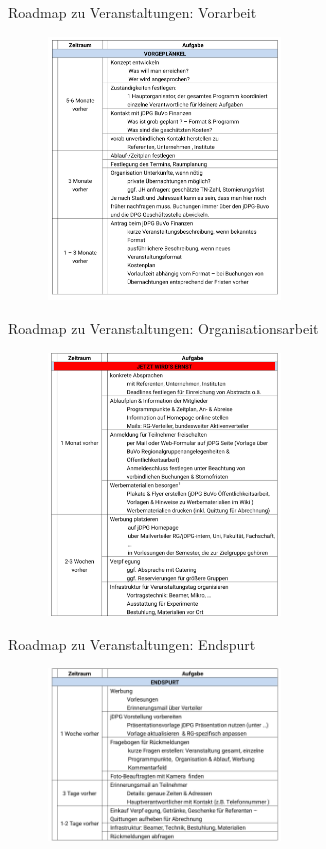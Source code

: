 \documentclass[
]{beamer}
\begin{document}
\begin{frame}{Roadmap zu Veranstaltungen: Vorarbeit}
  \begin{figure}
   \centering
   \includegraphics[width=0.55\textwidth]{figure/roadmap_vorbereitungen}
  \end{figure}
\end{frame}

\begin{frame}{Roadmap zu Veranstaltungen: Organisationsarbeit}
  \begin{figure}
   \centering
   \includegraphics[width=0.55\textwidth]{figure/roadmap_ernst}
  \end{figure}
\end{frame}

\begin{frame}{Roadmap zu Veranstaltungen: Endspurt}
  \begin{figure}
   \centering
   \includegraphics[width=0.55\textwidth]{figure/roadmap_endspurt}
  \end{figure}
\end{frame}
\end{document}
